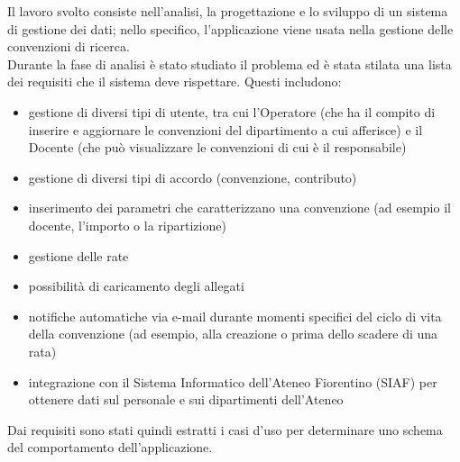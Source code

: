 Il lavoro svolto consiste nell'analisi, la progettazione e lo sviluppo di un sistema di gestione dei dati; nello specifico, l'applicazione viene usata nella gestione delle convenzioni di ricerca.\\
Durante la fase di analisi è stato studiato il problema ed è stata stilata una lista dei requisiti che il sistema deve rispettare. Questi includono:

\begin{itemize}
\item gestione di diversi tipi di utente, tra cui l'Operatore (che ha il compito di inserire e aggiornare le convenzioni del dipartimento a cui afferisce) e il Docente (che può visualizzare le convenzioni di cui è il responsabile)
\item gestione di diversi tipi di accordo (convenzione, contributo)
\item inserimento dei parametri che caratterizzano una convenzione (ad esempio il docente, l'importo o la ripartizione)
\item gestione delle rate
\item possibilità di caricamento degli allegati
\item notifiche automatiche via e-mail durante momenti specifici del ciclo di vita della convenzione (ad esempio, alla creazione o prima dello scadere di una rata)
\item integrazione con il Sistema Informatico dell'Ateneo Fiorentino (SIAF) per ottenere dati sul personale e sui dipartimenti dell'Ateneo
\end{itemize}

Dai requisiti sono stati quindi estratti i casi d'uso per determinare uno schema del comportamento dell'applicazione.\\\\


